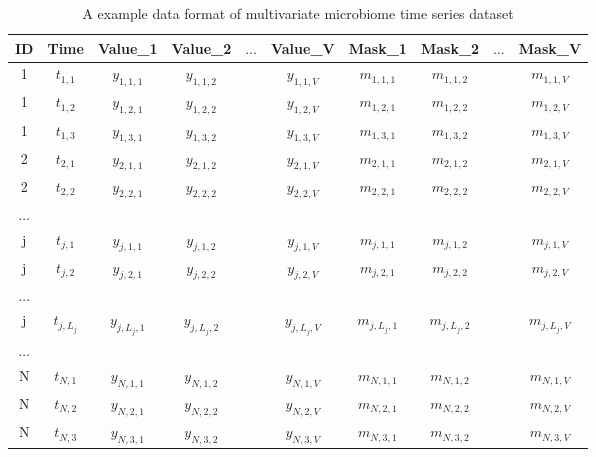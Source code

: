 \documentclass{article}
\begin{document}
\begin{table}[h!]
  \centering
  \caption{A example data format of multivariate microbiome time series dataset}
    \begin{tabular}{c|c|c|c|c|c|c|c|c|c}
    ID    & Time  & Value\_1 & Value\_2 & {$\ldots$} & Value\_V & Mask\_1 & Mask\_2 & {$\ldots$} & Mask\_V \\ \midrule
    {1} & $t_{1,1}$ & $y_{1,1,1}$ & $y_{1,1,2}$ &       & $y_{1,1,V}$ & $m_{1,1,1}$ & $m_{1,1,2}$ &       & $m_{1,1,V}$ \\ \hline
    {1} & $t_{1,2}$ & $y_{1,2,1}$ & $y_{1,2,2}$ &       & $y_{1,2,V}$ & $m_{1,2,1}$ & $m_{1,2,2}$ &       & $m_{1,2,V}$ \\ \hline
    {1} & $t_{1,3}$ & $y_{1,3,1}$ & $y_{1,3,2}$ &       & $y_{1,3,V}$ & $m_{1,3,1}$ & $m_{1,3,2}$ &       & $m_{1,3,V}$ \\ \hline
    {2} & $t_{2,1}$ & $y_{2,1,1}$ & $y_{2,1,2}$ &       & $y_{2,1,V}$ & $m_{2,1,1}$ & $m_{2,1,2}$ &       & $m_{2,1,V}$ \\ \hline
    {2} & $t_{2,2}$ & $y_{2,2,1}$ & $y_{2,2,2}$ &       & $y_{2,2,V}$ & $m_{2,2,1}$ & $m_{2,2,2}$ &       & $m_{2,2,V}$ \\ \hline
    $\ldots$ &       &       &       &       &       &       &       &       &  \\ \hline
    j     & $t_{j,1}$ & $y_{j,1,1}$ & $y_{j,1,2}$ &       & $y_{j,1,V}$ & $m_{j,1,1}$ & $m_{j,1,2}$ &       & $m_{j,1,V}$ \\ \hline
    j     & $t_{j,2}$ & $y_{j,2,1}$ & $y_{j,2,2}$ &       & $y_{j,2,V}$ & $m_{j,2,1}$ & $m_{j,2,2}$ &       & $m_{j,2,V}$ \\ \hline
    $\ldots$ &       &       &       &       &       &       &       &       &  \\ \hline
    j     & $t_{j,L_j}$ & $y_{j,L_j,1}$ & $y_{j,L_j,2}$ &       & $y_{j,L_j,V}$ & $m_{j,L_j,1}$ & $m_{j,L_j,2}$ &       & $m_{j,L_j,V}$ \\ \hline
    $\ldots$ &       &       &       &       &       &       &       &       &  \\ \hline
    N     & $t_{N,1}$ & $y_{N,1,1}$ & $y_{N,1,2}$ &       & $y_{N,1,V}$ & $m_{N,1,1}$ & $m_{N,1,2}$ &       & $m_{N,1,V}$ \\ \hline
    N     & $t_{N,2}$ & $y_{N,2,1}$ & $y_{N,2,2}$ &       & $y_{N,2,V}$ & $m_{N,2,1}$ & $m_{N,2,2}$ &       & $m_{N,2,V}$ \\ \hline
    N     & $t_{N,3}$ & $y_{N,3,1}$ & $y_{N,3,2}$ &       & $y_{N,3,V}$ & $m_{N,3,1}$ & $m_{N,3,2}$ &       & $m_{N,3,V}$ \\ 
    \end{tabular}
\label{input_format}
\end{table}
\end{document}
